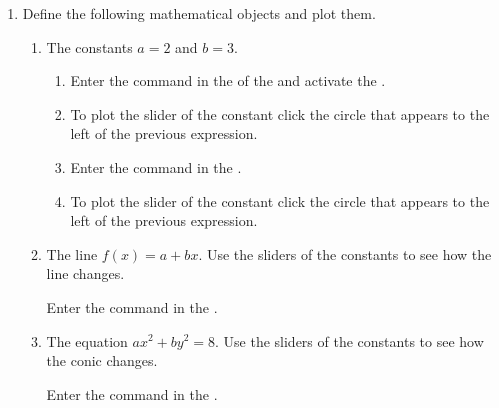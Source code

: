 \begin{enumerate}
\item Define the following mathematical objects and plot them.
      \begin{enumerate}
      \item The constants $a=2$ and $b=3$.
            \begin{indication}
            \begin{enumerate}
            \item Enter the command  in the  of the  and activate the .
            \item To plot the slider of the constant click the circle that appears to the left of the previous expression.
            \item Enter the command  in the .
            \item To plot the slider of the constant click the circle that appears to the left of the previous expression.
            \end{enumerate}
            \end{indication}
      \item The line $f(x)=a+bx$.
            Use the sliders of the constants to see how the line changes.
            \begin{indication}
            Enter the command  in the .
            \end{indication}
      \item The equation $ax^2+by^2=8$.
            Use the sliders of the constants to see how the conic changes.
            \begin{indication}
            Enter the command  in the .
            \end{indication}
      \end{enumerate}


\end{enumerate}
